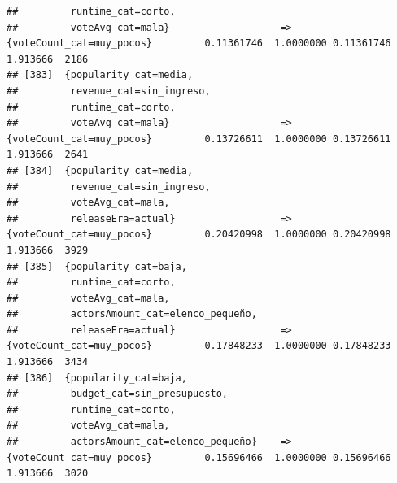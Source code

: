 \documentclass[
]{article}
\begin{document}
\begin{verbatim}
##         runtime_cat=corto,                                                                                                      
##         voteAvg_cat=mala}                   => {voteCount_cat=muy_pocos}         0.11361746  1.0000000 0.11361746 1.913666  2186
## [383]  {popularity_cat=media,                                                                                                   
##         revenue_cat=sin_ingreso,                                                                                                
##         runtime_cat=corto,                                                                                                      
##         voteAvg_cat=mala}                   => {voteCount_cat=muy_pocos}         0.13726611  1.0000000 0.13726611 1.913666  2641
## [384]  {popularity_cat=media,                                                                                                   
##         revenue_cat=sin_ingreso,                                                                                                
##         voteAvg_cat=mala,                                                                                                       
##         releaseEra=actual}                  => {voteCount_cat=muy_pocos}         0.20420998  1.0000000 0.20420998 1.913666  3929
## [385]  {popularity_cat=baja,                                                                                                    
##         runtime_cat=corto,                                                                                                      
##         voteAvg_cat=mala,                                                                                                       
##         actorsAmount_cat=elenco_pequeño,                                                                                        
##         releaseEra=actual}                  => {voteCount_cat=muy_pocos}         0.17848233  1.0000000 0.17848233 1.913666  3434
## [386]  {popularity_cat=baja,                                                                                                    
##         budget_cat=sin_presupuesto,                                                                                             
##         runtime_cat=corto,                                                                                                      
##         voteAvg_cat=mala,                                                                                                       
##         actorsAmount_cat=elenco_pequeño}    => {voteCount_cat=muy_pocos}         0.15696466  1.0000000 0.15696466 1.913666  3020

\end{verbatim}
\end{document}

